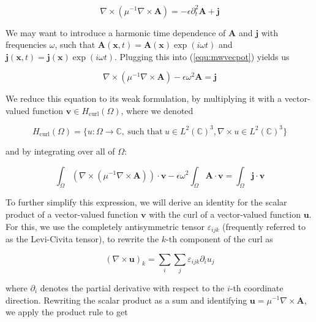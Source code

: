 \documentclass[11pt, a4paper]{article}
\begin{document}
\begin{equation}
    \nabla \times (\mu^{-1} \nabla \times \mathbf{A}) = - \epsilon
    \partial_t^2 \mathbf{A} + \mathbf{j} \label{equ:mwvecpot}
\end{equation}

We may want to introduce a harmonic time dependence
of $\mathbf{A}$ and $\mathbf{j}$ with frequencies $\omega$, such that $\mathbf{A}(\mathbf{x}, t) = 
\mathbf{A}(\mathbf{x})\exp(i \omega t)$ and $\mathbf{j}(\mathbf{x}, t) = 
\mathbf{j}(\mathbf{x})\exp(i \omega t)$. Plugging this into (\ref{equ:mwvecpot})
yields us

\begin{equation}
    \nabla \times (\mu^{-1} \nabla \times \mathbf{A}) -  \epsilon \omega^2 \mathbf{A} = \mathbf{j} \label{equ:mwtimeharm}
\end{equation}

We reduce this equation to its weak formulation, by multiplying it with a vector-valued 
function $\mathbf{v} \in H_{\text{curl}}(\Omega)$, where we denoted

\begin{equation}
    H_{\text{curl}}(\Omega) = \{u : \Omega \to \mathbb{C}, ~\text{such that}~ u \in L^2(\mathbb{C})^3,
    \nabla \times u \in L^2(\mathbb{C})^3 \}
\end{equation}

and by integrating over all of $\Omega$:

\begin{equation}
    \int_{\Omega} (\nabla \times ({\mu^{-1} \nabla \times \mathbf{A}})) \cdot \mathbf{v}
    - \epsilon \omega^2 \int_{\Omega} \mathbf{A} \cdot \mathbf{v} = \int_{\Omega} \mathbf{j} \cdot \mathbf{v} \label{equ:mwweak}
\end{equation}

To further simplify this expression, we will derive an identity for the scalar product
of a vector-valued function $\mathbf{v}$ with the curl of a vector-valued function 
$\mathbf{u}$. For this, we use the completely antisymmetric tensor $\varepsilon_{ijk}$
(frequently referred to as the Levi-Civita tensor), to rewrite the $k$-th component
of the curl as

\begin{equation}
    (\nabla \times \mathbf{u})_k = \sum_i \sum_j \varepsilon_{ijk} \partial_i u_j
\end{equation}

where $\partial_i$ denotes the partial derivative with respect to the $i$-th coordinate
direction. Rewriting the scalar product as a sum and identifying $\mathbf{u} = \mu^{-1}
\nabla \times \mathbf{A}$, we apply the product rule to get
\end{document}
